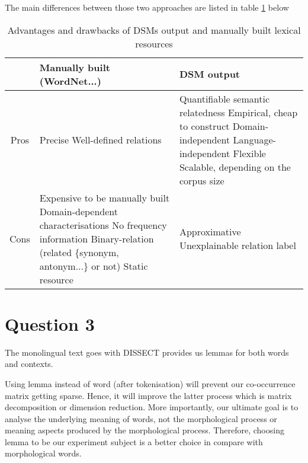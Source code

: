\documentclass[]{article}
\begin{document}
The main differences between those two approaches are listed in table \ref{table:1} below
\begin{table}
	\begin{tabular}{ | c | p{5cm} | p{5cm} | }
		\hline
		& Manually built (WordNet...) & DSM output \\
		\hline
		Pros &
			Precise \newline
			Well-defined relations \newline
		& 
			Quantifiable semantic relatedness \newline
			Empirical, cheap to construct \newline
			Domain-independent \newline
			Language-independent \newline
			Flexible \newline
			Scalable, depending on the corpus size \newline
		\\ 
		\hline
		Cons & 
			Expensive to be manually built \newline
			Domain-dependent characterisations \newline
			No frequency information \newline
			Binary-relation (related \{synonym, antonym...\} or not) \newline
			Static resource \newline
		& 
			Approximative \newline
			Unexplainable relation label \newline
		\\
		\hline
	\end{tabular}
	\caption{Advantages and drawbacks of DSMs output and manually built lexical resources}
	\label{table:1}
\end{table}

\section{Question 3}

The monolingual text goes with DISSECT provides us lemmas for both words and contexts.

Using lemma instead of word (after tokenisation) will prevent our co-occurrence matrix getting sparse. Hence, it will improve the latter process which is matrix decomposition or dimension reduction. More importantly, our ultimate goal is to analyse the underlying meaning of words, not the morphological process or meaning aspects produced by the morphological process. Therefore, choosing lemma to be our experiment subject is a better choice in compare with morphological words.
\end{document}
